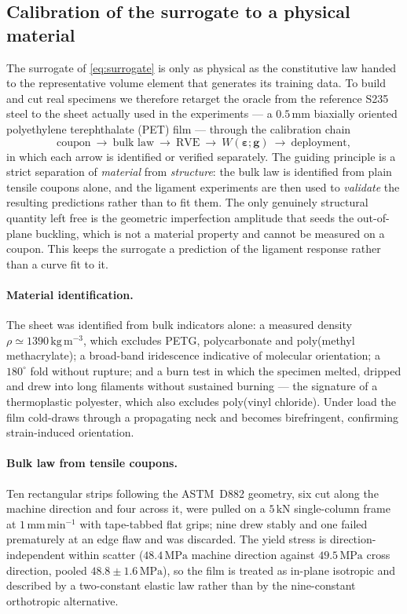 \documentclass[pdflatex,sn-mathphys-num]{sn-jnl}%
\theoremstyle{thmstyleone}%
\theoremstyle{thmstyletwo}%
\theoremstyle{thmstylethree}%
\newcommand{\epsh}{\bm{\varepsilon}}
\begin{document}
\subsection{Calibration of the surrogate to a physical material}
\label{sec:calibration}

The surrogate of \eqref{eq:surrogate} is only as physical as the constitutive law
handed to the representative volume element that generates its training data. To
build and cut real specimens we therefore retarget the oracle from the reference
S235 steel to the sheet actually used in the experiments --- a $0.5\,\mathrm{mm}$
biaxially oriented polyethylene terephthalate (PET) film --- through the
calibration chain
\begin{equation}
  \text{coupon}\ \longrightarrow\
  \text{bulk law}\ \longrightarrow\
  \text{RVE}\ \longrightarrow\
  W(\epsh;\bm{g})\ \longrightarrow\
  \text{deployment},
  \label{eq:calibration-chain}
\end{equation}
in which each arrow is identified or verified separately. The guiding principle is
a strict separation of \emph{material} from \emph{structure}: the bulk law is
identified from plain tensile coupons alone, and the ligament experiments are then
used to \emph{validate} the resulting predictions rather than to fit them. The
only genuinely structural quantity left free is the geometric imperfection
amplitude that seeds the out-of-plane buckling, which is not a material property
and cannot be measured on a coupon. This keeps the surrogate a prediction of the
ligament response rather than a curve fit to it.

\paragraph{Material identification.}
The sheet was identified from bulk indicators alone: a measured density
$\rho\simeq1390\,\mathrm{kg\,m^{-3}}$, which excludes PETG, polycarbonate and
poly(methyl methacrylate); a broad-band iridescence indicative of molecular
orientation; a $180^\circ$ fold without rupture; and a burn test in which the
specimen melted, dripped and drew into long filaments without sustained burning
--- the signature of a thermoplastic polyester, which also excludes poly(vinyl
chloride). Under load the film cold-draws through a propagating neck and becomes
birefringent, confirming strain-induced orientation.

\paragraph{Bulk law from tensile coupons.}
Ten rectangular strips following the ASTM~D882 geometry, six cut along the machine
direction and four across it, were pulled on a $5\,\mathrm{kN}$ single-column
frame at $1\,\mathrm{mm\,min^{-1}}$ with tape-tabbed flat grips; nine drew stably
and one failed prematurely at an edge flaw and was discarded. The yield stress is
direction-independent within scatter ($48.4\,\mathrm{MPa}$ machine direction
against $49.5\,\mathrm{MPa}$ cross direction, pooled
$48.8\pm1.6\,\mathrm{MPa}$), so the film is treated as in-plane isotropic and
described by a two-constant elastic law rather than by the nine-constant
orthotropic alternative.
\end{document}
